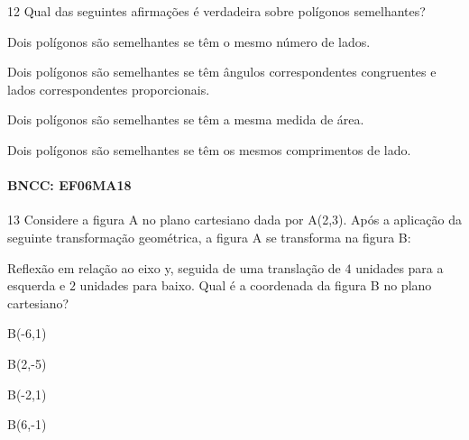 {\num{12} Qual das seguintes afirmações é verdadeira sobre polígonos
semelhantes?

\begin{escolha}
\item Dois polígonos são semelhantes se têm o mesmo número de lados.
\item Dois polígonos são semelhantes se têm ângulos correspondentes
congruentes e lados correspondentes proporcionais.
\item Dois polígonos são semelhantes se têm a mesma medida de área.
\item Dois polígonos são semelhantes se têm os mesmos comprimentos de lado.
\end{escolha}

\paragraph{BNCC: EF06MA18}


\num{13} Considere a figura A no plano cartesiano dada por A(2,3). Após a
aplicação da seguinte transformação geométrica, a figura A se transforma
na figura B:

Reflexão em relação ao eixo y, seguida de uma translação de $4$ unidades
para a esquerda e $2$ unidades para baixo. Qual é a coordenada da figura B no plano cartesiano?

\begin{escolha}
\item B(-6,1)
\item B(2,-5)
\item B(-2,1)
\item B(6,-1)
\end{escolha}

}
